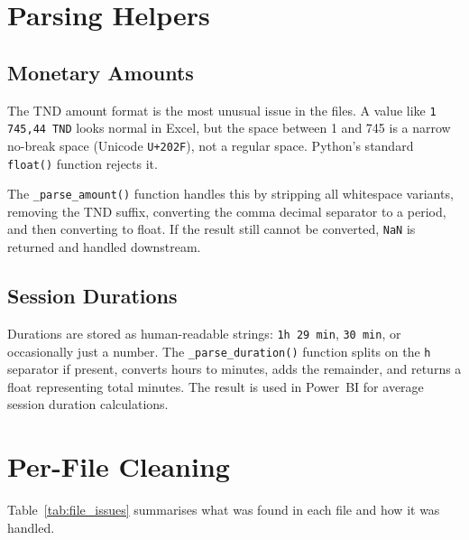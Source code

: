 \documentclass[12pt, a4paper]{report}
\begin{document}
\section{Parsing Helpers}

\subsection{Monetary Amounts}

The TND amount format is the most unusual issue in the files. A value like
\texttt{1 745,44 TND} looks normal in Excel, but the space between 1 and 745 is a
narrow no-break space (Unicode \texttt{U+202F}), not a regular space. Python's
standard \texttt{float()} function rejects it.

The \texttt{\_parse\_amount()} function handles this by stripping all whitespace
variants, removing the TND suffix, converting the comma decimal separator to a period,
and then converting to float. If the result still cannot be converted, \texttt{NaN}
is returned and handled downstream.

\subsection{Session Durations}

Durations are stored as human-readable strings: \texttt{1h 29 min}, \texttt{30 min},
or occasionally just a number. The \texttt{\_parse\_duration()} function splits on
the \texttt{h} separator if present, converts hours to minutes, adds the remainder,
and returns a float representing total minutes. The result is used in Power~BI
for average session duration calculations.

\section{Per-File Cleaning}

Table~\ref{tab:file_issues} summarises what was found in each file and how it was
handled.
\end{document}
